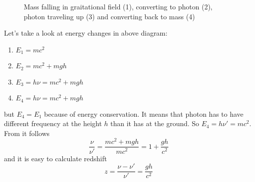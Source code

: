 \begin{wrapfigure}[16]{L}{0.5\linewidth}
    \centering
    \caption{Mass falling in graitational field (1), converting to
    photon (2), photon traveling up (3) and converting
    back to mass (4)}
\end{wrapfigure}

Let's take a look at energy changes in above diagram:
\begin{enumerate}[label=\protect\circled{\arabic*}]
    \item $E_1 = mc^2$
    \item $E_2 = mc^2 + mgh$
    \item $E_3 = h\nu = mc^2 + mgh$
    \item $E_4 = h\nu = mc^2 + mgh$
\end{enumerate}
but $E_4 = E_1$ because of energy conservation. It means that photon has to have
different frequency at the height $h$ than it has at the ground. So $E_4 = h\nu'
= mc^2$. From it follows
%
\begin{equation}
    \frac{\nu}{\nu'} = \frac{mc^2+mgh}{mc^2} = 1 + \frac{gh}{c^2}
\end{equation}
%
and it is easy to calculate redshift 
%
\begin{equation}
    \boxed{z = \frac{\nu - \nu'}{\nu'} = \frac{gh}{c^2}}
    \label{eq:prob2a_res}
\end{equation}

